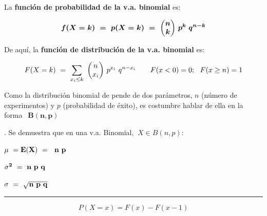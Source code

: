 \begin{definition}
	La \textbf{función de probabilidad de la v.a. binomial} es:
	
	$$\boldsymbol{f(X=k)\ =\ p(X=k)\ =\ \mqty(n\\k)\ p^k\ q^{n-k}}$$
	
	De aquí, la \textbf{función de distribución de la v.a. binomial} es:
	
	$$F(X=k)\ = \ \displaystyle \sum_{x_i\le k}\ \mqty(n\\ x_i) \ p^{x_i} \ q^{n-x_i} \qquad F(x<0)=0;\ \ F(x\ge n)=1$$
	
Como la distribución binomial de pende de dos parámetros, $n$ (número de experimentos) y $p$ (probabilidad de éxito), es costumbre hablar de ella en la forma $\ \boxed{\  \boldsymbol{B(n,p)} \ } \ $	
\end{definition}

\begin{theorem}
.	Se demuestra que en una v.a. Binomial, $\ X\in B(n,p)$:

\vspace{4mm} \hspace{2cm} $\bold{\mu \ = E(X)\ = \ \ n \ p}$

\hspace{2cm} $\bold{\sigma^2 \ = \ n\ p \ q}$

\hspace{2cm} $\bold{\sigma\ = \ \sqrt{n\ p\ q}}$

\vspace{-5mm} \begin{center} \textcolor{gris}{\rule{75mm}{0.1mm}} \end{center}

\vspace{-5mm} $$P(X=x)=F(x)-F(x-1)$$

\end{theorem}


